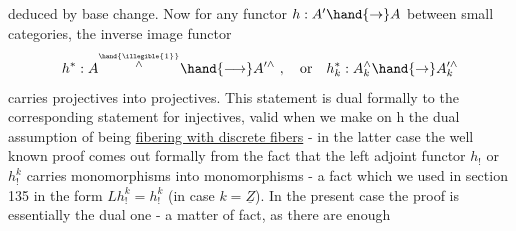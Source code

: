 deduced by base change.  Now for any  functor  $h: A' \hand{\to} A$ between small
categories,  the inverse image functor
\[ h^* : A^{\overset{\hand{\illegible{1}}}{\wedge}} \hand{\longrightarrow} A'^{\wedge} \ , \quad \text{or} \quad h^*_k : A^{\wedge}_k \hand{\to} A'^{\wedge}_k \]
carries  projectives into projectives.  This statement is dual formally
to the corresponding statement for injectives,  valid when we make on
h the dual assumption of being \uline{fibering with discrete fibers}  -  in the
latter case the \hand{(}well known\hand{)} proof comes out formally from the fact
that the left adjoint functor $h_!$ or $h^k_!$ carries monomorphisms into
monomorphisms   -  a fact which we used in section 135
in the form  $Lh^k_! = h^k_!$ (in case $k=\underline{Z}$).  In the present case the proof is
essentially the dual one  -   a matter of fact, as there are enough


